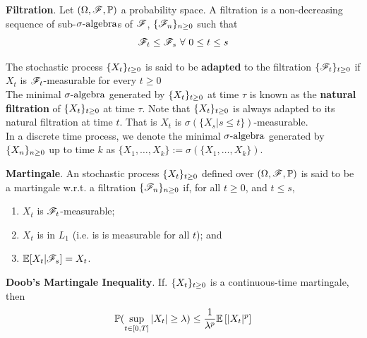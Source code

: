 \documentclass[../TGMAFFIRO.tex]{subfiles}
\begin{document}
\begin{definition} \textbf{Filtration}.
Let $(\Omega, \mathscr{F}, \mathbb{P})$ a probability space. A filtration is a non-decreasing sequence of sub-$\sigma\text{-algebra}$s of $\mathscr{F}$, $\{\mathscr{F}_n\}_{n\geq 0}$ such that 
\[
	\mathscr{F}_t \leq \mathscr{F}_s \ \forall \ 0 \leq t \leq s
\]
\end{definition}

The stochastic process $\{X_t\}_{t\geq 0}$ is said to be \textbf{adapted} to the filtration $\{\mathscr{F}_t\}_{t\geq 0}$ if $X_t$ is $\mathscr{F}_t$-measurable for every $t\geq 0$\\

The minimal $\sigma\text{-algebra}$ generated by $\{X_t\}_{t\geq 0}$ at time $\tau$ is known as the \textbf{natural filtration} of $\{X_t\}_{t\geq 0}$ at time $\tau$. Note that $\{X_t\}_{t\geq 0}$ is always adapted to its natural filtration at time $t$. That is $X_t$ is $\sigma(\{X_s | s \leq t\})$-measurable.\\

In a discrete time process, we denote the minimal $\sigma\text{-algebra}$ generated by $\{X_n\}_{n\geq 0}$ up to time $k$ as $\{X_1, \ldots, X_k\} := \sigma(\{X_1, \ldots, X_k\})$.

\begin{definition} \textbf{Martingale}.
	An stochastic process $\{X_t\}_{t\geq 0}$ defined over $(\Omega, \mathscr{F}, \mathbb{P})$ is said to be a martingale w.r.t. a filtration $\{\mathscr{F}_n\}_{n\geq 0}$ if, for all $t \geq 0$, and $t \leq s$,
	\begin{enumerate}
		\item $X_t$ is $\mathscr{F}_t$-measurable;
		\item $X_t$ is in $L_1$ (i.e. is is measurable for all $t$); and
		\item $\mathbb{E}[X_t | \mathscr{F}_s] = X_t$.
	\end{enumerate}
\end{definition}

\begin{theorem} \textbf{Doob's Martingale Inequality}. \label{th:doob_martingale}
	If. $\{X_t\}_{t\geq 0}$ is a continuous-time martingale, then 
	\begin{equation}
		\mathbb{P}(\sup_{t\in [0, T]} |X_t| \geq \lambda) \leq \frac{1}{\lambda^p}\mathbb{E}\left[|X_t|^p\right]
	\end{equation}
	
\end{theorem}

	
\end{document}
